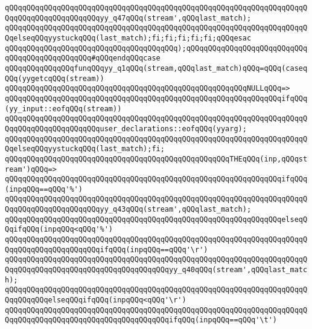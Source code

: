 \verb|qQQqqQQqqQQqqQQqqQQqqQQqqQQqqQQqqQQqqQQqqQQqqQQqqQQqqQQqqQQqqQQqqQQqqQQqqQQqqQQqqQQqqQQqqQQqyy_q47qQQq(stream',qQQqlast_match);|\newline
\verb|qQQqqQQqqQQqqQQqqQQqqQQqqQQqqQQqqQQqqQQqqQQqqQQqqQQqqQQqqQQqqQQqqQQqqQQqelseqQQqyystuckqQQq(last_match);fi;fi;fi;fi;fi;qQQqesac|\newline
\verb|qQQqqQQqqQQqqQQqqQQqqQQqqQQqqQQqqQQqqQQq);qQQqqQQqqQQqqQQqqQQqqQQqqQQqqQQqqQQqqQQqqQQqqQQq#qQQqendqQQqcase|\newline
\verb|qQQqqQQqqQQqqQQqfunqQQqyy_q1qQQq(stream,qQQqlast_match)qQQq=qQQq(caseqQQq(yygetcqQQq(stream))|\newline
\verb|qQQqqQQqqQQqqQQqqQQqqQQqqQQqqQQqqQQqqQQqqQQqqQQqqQQqqQQqNULLqQQq=>|\newline
\verb|qQQqqQQqqQQqqQQqqQQqqQQqqQQqqQQqqQQqqQQqqQQqqQQqqQQqqQQqqQQqqQQqifqQQq(yy_input::eofqQQq(stream))|\newline
\verb|qQQqqQQqqQQqqQQqqQQqqQQqqQQqqQQqqQQqqQQqqQQqqQQqqQQqqQQqqQQqqQQqqQQqqQQqqQQqqQQqqQQqqQQqqQQquser_declarations::eofqQQq(yyarg);|\newline
\verb|qQQqqQQqqQQqqQQqqQQqqQQqqQQqqQQqqQQqqQQqqQQqqQQqqQQqqQQqqQQqqQQqqQQqqQQqelseqQQqyystuckqQQq(last_match);fi;|\newline
\verb|qQQqqQQqqQQqqQQqqQQqqQQqqQQqqQQqqQQqqQQqqQQqqQQqqQQqTHEqQQq(inp,qQQqstream')qQQq=>|\newline
\verb|qQQqqQQqqQQqqQQqqQQqqQQqqQQqqQQqqQQqqQQqqQQqqQQqqQQqqQQqqQQqqQQqifqQQq(inpqQQq==qQQq'%')|\newline
\verb|qQQqqQQqqQQqqQQqqQQqqQQqqQQqqQQqqQQqqQQqqQQqqQQqqQQqqQQqqQQqqQQqqQQqqQQqqQQqqQQqqQQqqQQqqQQqyy_q43qQQq(stream',qQQqlast_match);|\newline
\verb|qQQqqQQqqQQqqQQqqQQqqQQqqQQqqQQqqQQqqQQqqQQqqQQqqQQqqQQqqQQqqQQqelseqQQqifqQQq(inpqQQq<qQQq'%')|\newline
\verb|qQQqqQQqqQQqqQQqqQQqqQQqqQQqqQQqqQQqqQQqqQQqqQQqqQQqqQQqqQQqqQQqqQQqqQQqqQQqqQQqqQQqqQQqqQQqifqQQq(inpqQQq==qQQq'\r')|\newline
\verb|qQQqqQQqqQQqqQQqqQQqqQQqqQQqqQQqqQQqqQQqqQQqqQQqqQQqqQQqqQQqqQQqqQQqqQQqqQQqqQQqqQQqqQQqqQQqqQQqqQQqqQQqqQQqyy_q40qQQq(stream',qQQqlast_match);|\newline
\verb|qQQqqQQqqQQqqQQqqQQqqQQqqQQqqQQqqQQqqQQqqQQqqQQqqQQqqQQqqQQqqQQqqQQqqQQqqQQqqQQqelseqQQqifqQQq(inpqQQq<qQQq'\r')|\newline
\verb|qQQqqQQqqQQqqQQqqQQqqQQqqQQqqQQqqQQqqQQqqQQqqQQqqQQqqQQqqQQqqQQqqQQqqQQqqQQqqQQqqQQqqQQqqQQqqQQqqQQqqQQqqQQqifqQQq(inpqQQq==qQQq'\t')|\newline
